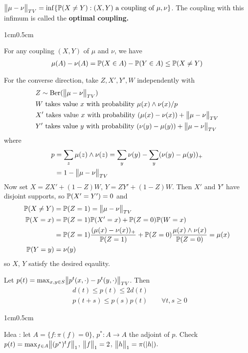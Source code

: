\documentclass[12pt,a4paper]{article}
\newenvironment{proof}
{\begin{changemargin}{1cm}{0.5cm} 
	}%
	{\end{changemargin}
}
\begin{document}
 $\bigl\lVert\mu - \nu\bigr\rVert_{TV} = \inf \{\mathbb{P} (X\neq Y) : (X,Y) \text{ a coupling of }\mu, \nu \}$. The coupling with this infimum is called the \textbf{optimal coupling.}
\begin{proof}
\pf For any coupling $(X,Y)$ of $\mu$ and $\nu$, we have
\begin{align*}
\mu(A) - \nu(A) = \mathbb{P}(X\in A) - \mathbb{P}(Y\in A)\leq \mathbb{P}(X\neq Y)
\end{align*}
\s

For the converse direction, take $Z, X', Y', W$ independently with
\begin{align*}
& Z \sim \text{Ber}(\bigl\lVert\mu-\nu\bigr\rVert_{TV}) \\
& W \text{ takes value } x \text{ with probability } \mu(x) \wedge \nu(x) /p \\
& X' \text{ takes value } x \text{ with probability } (\mu(x)- \nu(x)) + \bigl\lVert\mu-\nu\bigr\rVert_{TV} \\
& Y' \text{ takes value } y \text{ with probability } (\nu(y)- \mu(y)) + \bigl\lVert\mu-\nu\bigr\rVert_{TV}
\end{align*}
where
\begin{align*}
p &= \sum_z \mu(z)\wedge \nu(z) = \sum_y \nu(y) - \sum_y (\nu(y) - \mu(y))_+ \\
&= 1 - \bigl\lVert\mu - \nu\bigr\rVert_{TV} \\
\end{align*}
Now set $X = ZX' + (1-Z)W$, $Y = ZY' + (1-Z)W$. Then $X'$ and $Y'$ have disjoint supports, so $\mathbb{P}(X' = Y')=0$ and
\begin{align*}
\mathbb{P}(X\neq Y) &= \mathbb{P}(Z=1) = \bigl\lVert\mu - \nu\bigr\rVert_{TV}\\
\mathbb{P}(X=x) &= \mathbb{P}(Z=1)\mathbb{P}(X'=x) + \mathbb{P}(Z=0)\mathbb{P}(W=x) \\
&= \mathbb{P}(Z=1) \frac{(\mu(x)- \nu(x))_+}{\mathbb{P}(Z=1)} + \mathbb{P}(Z=0)\frac{\mu(x)\wedge \nu(x)}{\mathbb{P}(Z=0)} = \mu(x) \\
\mathbb{P}(Y=y) &= \nu(y)
\end{align*}
so $X$, $Y$ satisfy the desired eqaulity.

\eop
\end{proof}
\s

 Let $p(t) = \max_{x,y\in S} \bigl\lVert p^t(x,\cdot) - p^t (y, \cdot)\bigr\rVert_{TV}$. Then 
\begin{align*}
& d (t) \leq p(t) \leq 2d(t) \\
& p(t+s) \leq p(s)p(t) \quad\quad \forall t,s\geq 0
\end{align*}
\begin{proof}
Idea : let $A = \{f: \pi(f)=0 \}$, $p^*: A\rightarrow A$ the adjoint of $p$. Check $p(t) = \max_{f\in A}\bigl\lVert(p^*)^t f\bigr\rVert_{1}$, $\bigl\lVert f\bigr\rVert_{1}=2$, $\bigl\lVert h\bigr\rVert_{1} = \pi(|h|)$.
\end{proof}
\s
\end{document}
